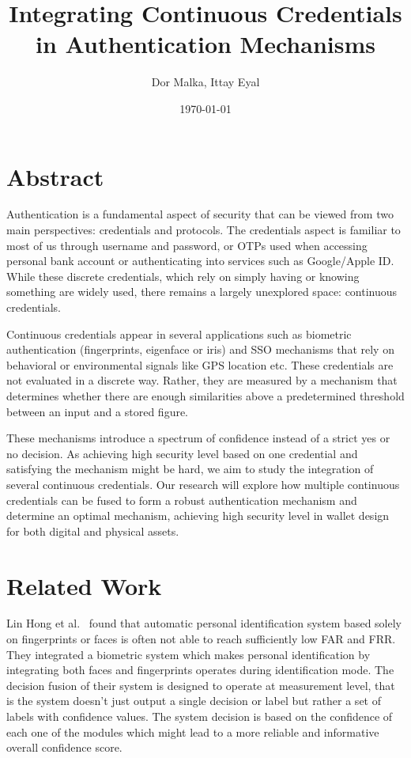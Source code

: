 \documentclass{article}
\title{Integrating Continuous Credentials in Authentication
Mechanisms}
\author{Dor Malka, Ittay Eyal}
\date{\today}
\begin{document}
\maketitle

\section{Abstract}
Authentication is a fundamental aspect of security that can be viewed from two main perspectives: credentials and protocols. The credentials aspect is familiar to most of us through username and password, or OTPs used when accessing personal bank account or authenticating into services such as Google/Apple ID. While these discrete credentials, which rely on simply having or knowing something are widely used, there remains a largely unexplored space: continuous credentials.

Continuous credentials appear in several applications such as biometric authentication (fingerprints, eigenface or iris) and SSO mechanisms that rely on behavioral or environmental signals like GPS location etc. These credentials are not evaluated in a discrete way. Rather, they are measured by a mechanism that determines whether there are enough similarities above a predetermined threshold between an input and a stored figure.

These mechanisms introduce a spectrum of confidence instead of a strict yes or no decision. As achieving high security level based on one credential and satisfying the mechanism might be hard, we aim to study the integration of several continuous credentials. Our research will explore how multiple continuous credentials can be fused to form a robust authentication mechanism and determine an optimal mechanism, achieving high security level in wallet design for both digital and physical assets.
\section{Related Work}
Lin Hong et al.~\cite{hong1998} found that automatic personal identification system based solely on fingerprints or faces is often not able to reach sufficiently low FAR and FRR. They integrated a biometric system which makes personal identification by integrating both faces and fingerprints operates during identification mode. The decision fusion of their system is designed to operate at measurement level, that is the system doesn’t just output a single decision or label but rather a set of labels with confidence values. The system decision is based on the confidence of each one of the modules which might lead to a more reliable and informative overall confidence score.
\end{document}
